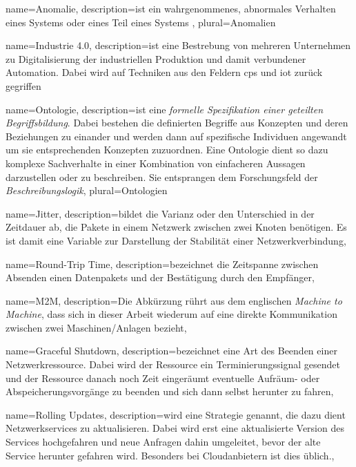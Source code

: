 {
  name={Anomalie},
  description={ist ein wahrgenommenes, abnormales Verhalten eines Systems oder eines Teil eines Systems \cite{pardo2016framework}},
  plural={Anomalien}
}

{
  name={Industrie 4.0},
  description={ist eine Bestrebung von mehreren Unternehmen zu Digitalisierung der industriellen Produktion und damit verbundener Automation. Dabei wird auf Techniken aus den Feldern \acrshort{cps} und \acrshort{iot} zurück gegriffen}
}

{
  name={Ontologie},
  description={ist eine \textit{formelle Spezifikation einer geteilten Begriffsbildung}\cite{guarino2009ontology}. Dabei bestehen die definierten Begriffe aus Konzepten und deren Beziehungen zu einander und werden dann auf spezifische Individuen angewandt um sie entsprechenden Konzepten zuzuordnen. Eine Ontologie dient so dazu komplexe Sachverhalte in einer Kombination von einfacheren Aussagen darzustellen oder zu beschreiben. Sie entsprangen dem Forschungsfeld der \textit{Beschreibungslogik}\cite{roy2010exploitation}},
  plural={Ontologien}
}

{
  name={Jitter},
  description={bildet die Varianz oder den Unterschied in der Zeitdauer ab, die Pakete in einem Netzwerk zwischen zwei Knoten benötigen. Es ist damit eine Variable zur Darstellung der Stabilität einer Netzwerkverbindung},
}

{
  name={Round-Trip Time},
  description={bezeichnet die Zeitspanne zwischen Absenden einen Datenpakets und der Bestätigung durch den Empfänger},
}

{
  name={M2M},
  description={Die Abkürzung rührt aus dem englischen \textit{Machine to Machine}, dass sich in dieser Arbeit wiederum auf eine direkte Kommunikation zwischen zwei Maschinen/Anlagen bezieht},
}

{
  name={Graceful Shutdown},
  description={bezeichnet eine Art des Beenden einer Netzwerkressource. Dabei wird der Ressource ein Terminierungssignal gesendet und der Ressource danach noch Zeit eingeräumt eventuelle Aufräum- oder Abspeicherungsvorgänge zu beenden und sich dann selbst herunter zu fahren},
}

{
  name={Rolling Updates},
  description={wird eine Strategie genannt, die dazu dient Netzwerkservices zu aktualisieren. Dabei wird erst eine aktualisierte Version des Services hochgefahren und neue Anfragen dahin umgeleitet, bevor der alte Service herunter gefahren wird. Besonders bei Cloudanbietern ist dies üblich.},
}

